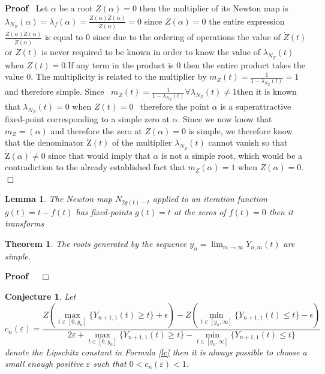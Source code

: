 \documentclass{article}
\newcommand{\Zeta}{\mathrm{Z}}
\newenvironment{proof}{\noindent\textbf{Proof\ }}{\hspace*{\fill}$\Box$\medskip}
\newtheorem{conjecture}{Conjecture}
\newtheorem{lemma}{Lemma}
{\theorembodyfont{\rmfamily}\newtheorem{note}{Note}}
\newtheorem{theorem}{Theorem}
\begin{document}
\begin{proof}
  Let $\alpha$ be a root $Z (\alpha) = 0$ then the multiplier of its Newton
  map is $\lambda_{N_Z} (\alpha) = \lambda_f (\alpha) = \frac{Z (\alpha)
  \ddot{Z} (\alpha)}{\dot{Z} (\alpha)} = 0$ since $Z (\alpha) = 0$ the entire
  expression $\frac{Z (\alpha) \ddot{Z} (\alpha)}{\dot{Z} (\alpha)}$ is equal
  to 0 since due to the ordering of operations the value of $\dot{Z} (t)$ or
  $\ddot{Z} (t)$ is never required to be known in order to know the value of
  $\lambda_{N_Z} (t)$ when $Z (t) = 0$.\quad If any term in the product is 0
  then the entire product takes the value 0. The multiplicity is related to
  the multiplier by $m_Z (t) = \frac{1}{1 - \lambda_{N_Z} (t)} = 1$ and
  therefore simple. Since \ $m_Z (t) = \frac{1}{1 - \lambda_{N_Z} (t)} \forall
  \lambda_{N_Z} (t) \neq 1$then it is known that $\lambda_{N_Z} (t) = 0$ when
  $Z (t_{}) = 0$ \ therefore the point $\alpha$ is a superattractive
  fixed-point corresponding to a simple zero at $\alpha$. Since we now know
  that $m_Z = (\alpha)$ and therefore the zero at $Z (\alpha) = 0$ is simple,
  we therefore know that the denominator $\dot{\Zeta} (t)$ of the multiplier
  $\lambda_{N_Z} (t)$ cannot vanish so that \ \ $\dot{\Zeta} (\alpha) \neq 0$
  since that would imply that $\alpha$ is not a simple root, which would be a
  contradiction to the already established fact that $m_Z (\alpha) = 1$ when
  $Z (\alpha) = 0$.
\end{proof}

\begin{lemma}
  The Newton map $N_{2 g (t) - t}$ applied to an iteration function $g (t) = t
  - f (t)$ has fixed-points $g (t) = t$ at the zeros of $f (t) = 0$ then it
  transforms
\end{lemma}

\begin{theorem}
  The roots generated by the sequence $y_n = \lim_{m \rightarrow \infty} Y_{n,
  m} (t)$ are simple.
\end{theorem}

\begin{proof}
  \ 
\end{proof}

\begin{conjecture}
  Let
  \begin{equation}
    c_n (\varepsilon) = \frac{Z (\max_{t \in [0, y_n]} \{ Y_{n + 1, 1} (t)
    \geqslant t \} + \epsilon) - Z (\min_{t \in [y_n, \infty]} \{ Y_{n + 1, 1}
    (t) \leqslant t \} - \epsilon)}{2 \varepsilon + \max_{t \in [0, y_n]} \{
    Y_{n + 1, 1} (t) \geqslant t \} - \min_{t \in [y_n, \infty]} \{ Y_{n + 1,
    1} (t) \leqslant t \}}
  \end{equation}
  denote the Lipschitz constant in Formula \ref{lc} then it is always possible
  to choose a small enough positive $\varepsilon$ such that $0 < c_n
  (\varepsilon) < 1$.
\end{conjecture}
\end{document}
